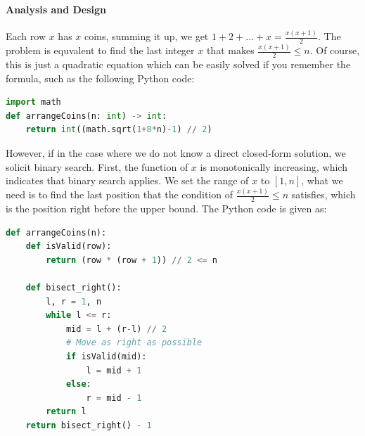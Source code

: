 \documentclass[main.tex]{subfiles}
\begin{document}
\paragraph{Analysis and Design} Each row $x$ has $x$ coins, summing it up, we get $1+2+...+x= \frac{x(x+1)}{2}$. The problem is equvalent to find the last integer $x$ that makes $\frac{x(x+1)}{2}\leq n$. Of course, this is just a quadratic equation which can be easily solved if you remember the formula, such as the following Python code:
\begin{lstlisting}[language=Python]
import math
def arrangeCoins(n: int) -> int:
    return int((math.sqrt(1+8*n)-1) // 2)
\end{lstlisting}
However, if in the case where we do not know a direct closed-form solution, we solicit binary search. First, the function of $x$ is monotonically increasing, which indicates that binary search applies. We set the range of $x$ to $[1, n]$, what we need is to find the last position that the condition of  $\frac{x(x+1)}{2}\leq n$ satisfies, which is the position right before the upper bound. The Python code is given as:
\begin{lstlisting}[language=Python]
def arrangeCoins(n):
    def isValid(row):
        return (row * (row + 1)) // 2 <= n
    
    def bisect_right():
        l, r = 1, n
        while l <= r:
            mid = l + (r-l) // 2
            # Move as right as possible
            if isValid(mid): 
                l = mid + 1
            else:
                r = mid - 1
        return l
    return bisect_right() - 1
\end{lstlisting}


\end{document}
